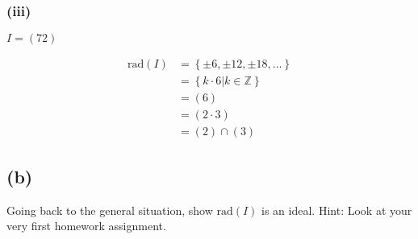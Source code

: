 \documentclass[10pt]{armath}
\newcommand{\Z}{\mathbb{Z}}
\newcommand{\rad}[1]{\text{rad}\left(#1\right)}
\begin{document}
\subsubsection*{(iii)}%
\label{ssub:_i_}

$I=(72)$

\begin{align*}
  \rad{I}&=\left\{\pm6, \pm12, \pm18, \ldots\right\}\\
  &=\left\{k\cdot 6|k\in\Z\right\}\\
  &=(6)\\
  &=(2\cdot 3)\\
  &=(2)\cap(3)
\end{align*}

\subsection*{(b)}%
\label{sub:_b3_}

Going back to the general situation, show $\rad{I}$ is an ideal. Hint: Look at
your very first homework assignment.
\end{document}
